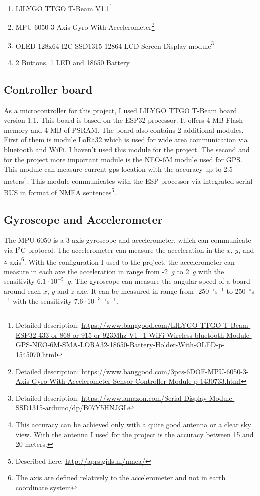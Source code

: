 \documentclass[hidelinks,a4paper]{article}
\begin{document}
\begin{enumerate}
    \item LILYGO TTGO T-Beam V1.1\footnote{Detailed description: \url{https://www.banggood.com/LILYGO-TTGO-T-Beam-ESP32-433-or-868-or-915-or-923Mhz-V1_1-WiFi-Wireless-bluetooth-Module-GPS-NEO-6M-SMA-LORA32-18650-Battery-Holder-With-OLED-p-1545070.html}}
    \item MPU-6050 3 Axis Gyro With Accelerometer\footnote{Detailed description: \url{https://www.banggood.com/3pcs-6DOF-MPU-6050-3-Axis-Gyro-With-Accelerometer-Sensor-Controller-Module-p-1430733.html}}
    \item OLED 128x64 I2C SSD1315 12864 LCD Screen Display module\footnote{Detailed description: \url{https://www.amazon.com/Serial-Display-Module-SSD1315-arduino/dp/B07Y5HNJGL}}
    \item 2 Buttons, 1 LED and 18650 Battery
\end{enumerate}

\subsection{Controller board}

As a microcontroller for this project, I used LILYGO TTGO T-Beam board version 1.1. This board is based on the ESP32 processor. It offers 4 MB Flash memory and 4 MB of PSRAM. The board also contains 2 additional modules. First of them is module LoRa32 which is used for wide area communication via bluetooth and WiFi. I haven't used this module for the project. The second and for the project more important module is the NEO-6M module used for GPS. This module can measure current gps location with the accuracy up to 2.5 meters\footnote{This accuracy can be achieved only with a quite good antenna or a clear sky view. With the antenna I used for the project is the accuracy between 15 and 20 meters.}. This module communicates with the ESP processor via integrated serial BUS in format of NMEA sentences\footnote{Described here: \url{http://aprs.gids.nl/nmea/}}.

\subsection{Gyroscope and Accelerometer}

The MPU-6050 is a 3 axis gyroscope and accelerometer, which can communicate via I${}^2$C protocol. The accelerometer can measure the acceleration in the $x$, $y$, and $z$ axis\footnote{The axis are defined relatively to the accelerometer and not in earth coordinate system}. With the configuration I used to the project, the accelerometer can measure in each axe the acceleration in range from -2~$g$ to 2~$g$ with the sensitivity $6.1 \cdot 10^{-5}$~$g$. The gyroscope can measure the angular speed of a board around each $x$, $y$ and $z$ axe. It can be measured in range from -250~${}^{\circ}$s${}^{-1}$ to 250~${}^{\circ}$s${}^{-1}$ with the sensitivity $7.6 \cdot 10^{-3}$~${}^{\circ}$s${}^{-1}$.
\end{document}
